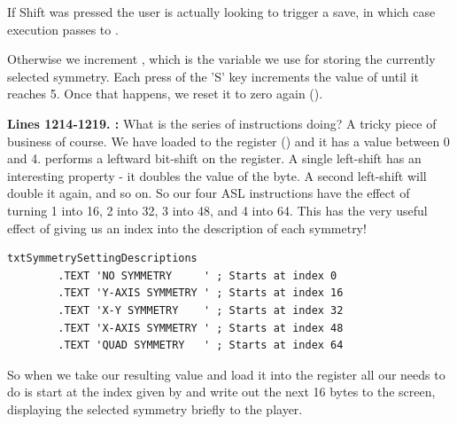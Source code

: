 If Shift was pressed the user is actually looking to trigger a save, in which case execution passes to .

Otherwise we increment , which is the variable we use for storing the currently selected symmetry.
Each press of the 'S' key increments the value of  until it reaches 5. Once that happens, we 
reset it to zero again ().

\textbf{Lines 1214-1219. :} What is the series of  instructions doing? A tricky
piece of business of course. We have loaded  to the  register () and it has a value between 0 and 4.
 performs a leftward bit-shift on the  register. A single left-shift has an interesting property - it doubles the
value of the byte. A second left-shift will double it again, and so on. So our four {ASL} instructions have the effect of turning 1 into
16, 2 into 32, 3 into 48, and 4 into 64. This has the very useful effect of giving us an index into the description of each symmetry!

\begin{lstlisting}[escapechar=\%]
txtSymmetrySettingDescriptions 
        .TEXT 'NO SYMMETRY     ' ; Starts at index 0
        .TEXT 'Y-AXIS SYMMETRY ' ; Starts at index 16
        .TEXT 'X-Y SYMMETRY    ' ; Starts at index 32
        .TEXT 'X-AXIS SYMMETRY ' ; Starts at index 48
        .TEXT 'QUAD SYMMETRY   ' ; Starts at index 64
\end{lstlisting}

So when we take our resulting value and load it into the  register all our  needs to do is start at the 
index given by  and write out the next 16 bytes to the screen, displaying the selected symmetry briefly to the player.


